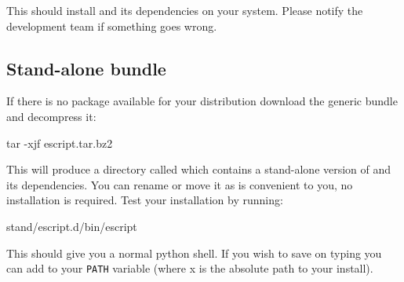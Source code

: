 This should install \esfinley and its dependencies on your system.
Please notify the development team if something goes wrong.


\subsection{Stand-alone bundle}\label{sec:standalonelinux}

If there is no package available for your distribution download the generic \linux bundle and decompress it:
\begin{shellCode}
tar -xjf escript.tar.bz2 
\end{shellCode}
This will produce a directory called  which contains a stand-alone version of \esfinley and its dependencies.
You can rename or move it as is convenient to you, no installation is required.
Test your installation by running:
\begin{shellCode}
stand/escript.d/bin/escript
\end{shellCode}
This should give you a normal python shell.
If you wish to save on typing you can add  to your \texttt{PATH} variable (where x is the absolute path to your install).


